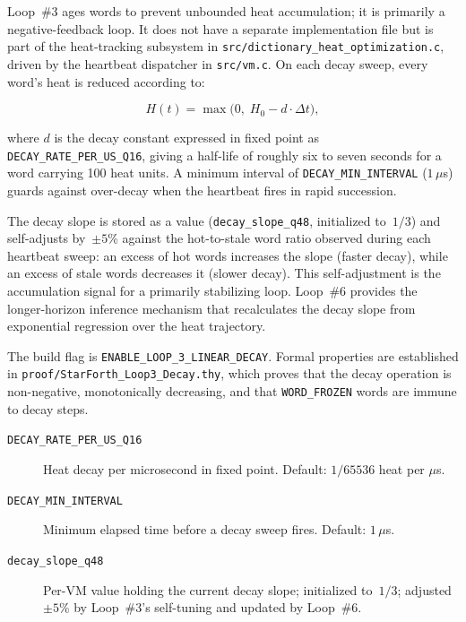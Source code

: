 Loop~\#3 ages words to prevent unbounded heat accumulation; it is primarily a
negative-feedback loop. It does not have a separate implementation file but is
part of the heat-tracking subsystem in
\texttt{src/dictionary\_heat\_optimization.c}, driven by the heartbeat
dispatcher in \texttt{src/vm.c}. On each decay sweep, every word's heat is
reduced according to:

\begin{equation}
  H(t) = \max\!\bigl(0,\; H_0 - d \cdot \Delta t\bigr),
\end{equation}

where $d$ is the decay constant expressed in \Qtype{} fixed point as
\texttt{DECAY\_RATE\_PER\_US\_Q16}, giving a half-life of roughly six to seven
seconds for a word carrying 100 heat units. A minimum interval of
\texttt{DECAY\_MIN\_INTERVAL} ($1\,\mu$s) guards against over-decay when the
heartbeat fires in rapid succession.

The decay slope is stored as a \Qtype{} value (\texttt{decay\_slope\_q48},
initialized to~$1/3$) and self-adjusts by~$\pm 5$\% against the hot-to-stale
word ratio observed during each heartbeat sweep: an excess of hot words
increases the slope (faster decay), while an excess of stale words decreases
it (slower decay). This self-adjustment is the accumulation signal for a
primarily stabilizing loop. Loop~\#6 provides the longer-horizon inference
mechanism that recalculates the decay slope from exponential regression over
the heat trajectory.

The build flag is \texttt{ENABLE\_LOOP\_3\_LINEAR\_DECAY}. Formal properties
are established in \texttt{proof/StarForth\_Loop3\_Decay.thy}, which proves
that the decay operation is non-negative, monotonically decreasing, and that
\texttt{WORD\_FROZEN} words are immune to decay steps.

\begin{description}
  \item[\texttt{DECAY\_RATE\_PER\_US\_Q16}] Heat decay per microsecond in
    \Qtype{} fixed point. Default: $1/65536$ heat per $\mu$s.
  \item[\texttt{DECAY\_MIN\_INTERVAL}] Minimum elapsed time before a decay
    sweep fires. Default: $1\,\mu$s.
  \item[\texttt{decay\_slope\_q48}] Per-VM \Qtype{} value holding the current
    decay slope; initialized to~$1/3$; adjusted $\pm 5$\% by Loop~\#3's
    self-tuning and updated by Loop~\#6.
\end{description}

